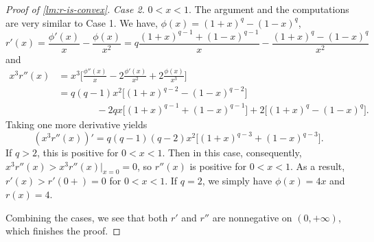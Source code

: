 \documentclass[10pt]{article}
\newcommand{\1}{\textbf{1}}
\newtheorem{lemma}{Lemma}[subsection]
\theoremstyle{remark}
\theoremstyle{definition}
\begin{document}
\begin{proof}[Proof of \ref{lm:r-is-convex}]
\bigskip
\noindent
\emph{Case 2.} $0 < x < 1$. The argument and the computations are very similar to Case 1. We have, $\phi(x) = (1+x)^q - (1-x)^q$,
\[
r'(x) = \frac{\phi'(x)}{x} - \frac{\phi(x)}{x^2} = q\frac{(1+x)^{q-1}+(1-x)^{q-1}}{x} - \frac{(1+x)^q-(1-x)^q}{x^2}
\]
and
\begin{align*}
x^3r''(x) &= x^3\Bigg[\frac{\phi''(x)}{x}-2\frac{\phi'(x)}{x^2}+2\frac{\phi(x)}{x^3}\Bigg] \\
&=q(q-1)x^2\Big[(1+x)^{q-2}-(1-x)^{q-2}\Big] \\
&\qquad\qquad-2qx\Big[(1+x)^{q-1}+(1-x)^{q-1}\Big]+ 2\Big[(1+x)^q-(1-x)^q\Big].
\end{align*}
Taking one more derivative yields
\[
(x^3r''(x))' = q(q-1)(q-2)x^2\Big[(1+x)^{q-3}+(1-x)^{q-3}\Big].
\]
If $q > 2$, this is positive for $0 < x  < 1$. Then in this case, consequently, $x^3r''(x) > x^3r''(x)\Big|_{x=0} = 0$, so $r''(x)$ is positive for $0 < x < 1$. As a result, $r'(x) > r'(0+) = 0$ for $0 < x < 1$. If $q = 2$, we simply have $\phi(x) = 4x$ and $r(x) = 4$. 

Combining the cases, we see that both $r'$ and $r''$ are nonnegative on $(0,+\infty)$, which finishes the proof.
\end{proof}

\end{document}

